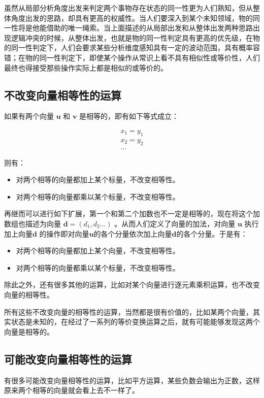 \documentclass[12pt,oneside]{book}
\begin{document}
虽然从局部分析角度出发来判定两个事物存在状态的同一性更为人们熟知，但从整体角度出发的思路，却具有更高的权威性。当人们要深入到某个未知领域，物的同一性将是他能借助的唯一绳索。当上面描述的从局部出发和从整体出发两种思路出现逻辑冲突的时候，从整体出发，也就是物的同一性判定具有更高的优先级，在物的同一性判定下，人们会要求某些分析维度感知具有一定的波动范围，具有概率容错；在物的同一性判定下，即使某个操作从常识上看不具有相似性或等价性，人们最终也得接受那些操作实际上都是相似的或等价的。

\subsection{不改变向量相等性的运算}
如果有两个向量 $\boldsymbol{u}$ 和 $\boldsymbol{v}$ 是相等的，即有如下等式成立：

\begin{align*}
x_1 = y_1\\
x_2 = y_2\\
...
\end{align*}

则有：

\begin{itemize}
\item 对两个相等的向量都加上某个标量，不改变相等性。
\item 对两个相等的向量都乘以某个标量，不改变相等性。
\end{itemize}

再继而可以进行如下扩展，第一个和第二个加数也不一定是相等的，现在将这个加数组也描述为向量 $\boldsymbol{d} = (d_1, d_2 ...)$ 。从而人们定义了向量的加法，对向量 $\boldsymbol{u}$ 执行加上向量$\boldsymbol{d}$ 的操作即对向量$\boldsymbol{u}$的各个分量依次加上向量$\boldsymbol{d}$的各个分量。于是有：


\begin{itemize}
\item 对两个相等的向量都加上某个向量，不改变相等性。
\item 对两个相等的向量都乘以某个标量，不改变相等性。
\end{itemize}

除此之外，还有很多其他的运算，比如对某个向量进行逐元素乘积运算，也不改变向量的相等性。

所有这些不改变向量的相等性的运算，当然都是很有价值的，比如某两个向量，其实状态是未知的，在经过了一系列的等价变换运算之后，就有可能能够发现这两个向量是相等的。


\subsection{可能改变向量相等性的运算}
有很多可能改变向量相等性的运算，比如平方运算，某些负数会输出为正数，这样原来两个相等的向量就会看上去不一样了。
\end{document}
